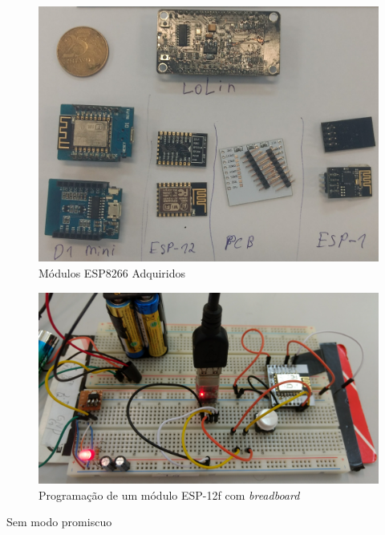 \begin{figure}[htb]
	\caption{\label{fig:modulos-esp}Módulos ESP8266 Adquiridos}
	\begin{center}
		\includegraphics[width=1\textwidth]{040-plataformas/modulos-esp.jpg}
	\end{center}
\end{figure}

\begin{figure}[htb]
	\caption{\label{fig:modulos-esp}Programação de um módulo ESP-12f com \emph{breadboard}}
	\begin{center}
		\includegraphics[width=1\textwidth]{040-plataformas/esp-dev/breadboard.jpg}
	\end{center}
\end{figure}


Sem modo promiscuo

